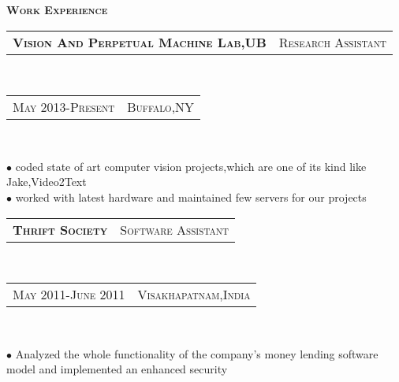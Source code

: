 \documentclass[10pt,a4paper,oneside]{article}
\begin{document}
    \begin{minipage}[t]{0.63\textwidth}
        \vspace{0pt}
        \textcolor{light-gray}{\textbf{\large W\textsc{ork} E\textsc{xperience}}}
        \vspace{10pt}\\
        \begin{tabular}{c|c}
            \textbf{\normalsize V\textsc{ision} A\textsc{nd} P\textsc{erpetual} M\textsc{achine} L\textsc{ab},UB}
            &\textmd{\normalsize R\textsc{esearch} A\textsc{ssistant}}
        \end{tabular}\\
        \textcolor{light-gray}{
            \begin{tabular}{c|c}
                {\small M\textsc{ay 2013}-P\textsc{resent}}
               &{\small B\textsc{uffalo},NY}
            \end{tabular}
        }\\ 
        \vspace{-4mm}
        \begin{adjustwidth}{7pt}{0pt}
            {\footnotesize $\bullet$ coded state of art computer vision projects,which are one of its kind like Jake,Video2Text\\
            $\bullet$ worked with latest hardware and maintained few servers for our projects }\\
        \end{adjustwidth}
        \begin{tabular}{c|c}
            \textbf{\normalsize T\textsc{hrift} S\textsc{ociety}}
            &\textmd{\normalsize S\textsc{oftware} A\textsc{ssistant}}
        \end{tabular}\\
        \textcolor{light-gray}{
            \begin{tabular}{c|c}
                {\small M\textsc{ay 2011}-J\textsc{une 2011}}
                &{\small V\textsc{isakhapatnam},I\textsc{ndia}}
            \end{tabular}
        }\\ 
        \vspace{-4mm}
        \begin{adjustwidth}{7pt}{0pt}
            {\footnotesize $\bullet$ Analyzed the whole functionality of the company's money lending software model and implemented an enhanced security
}
\end{adjustwidth}
\end{minipage}
\end{document}
